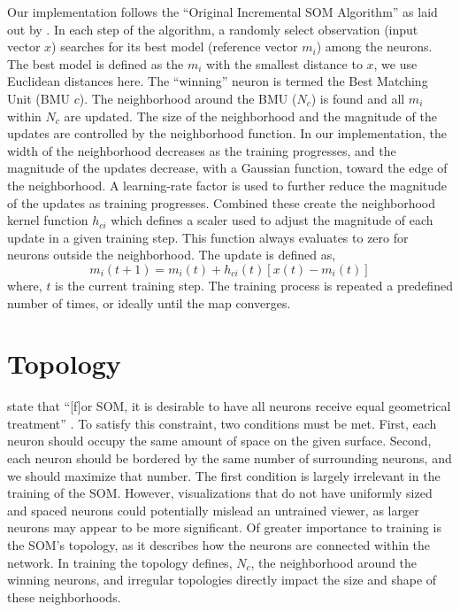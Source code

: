 Our implementation follows the ``Original Incremental SOM Algorithm'' as laid
out by \cite{Kohonen2000}.  In each step of the algorithm, a
randomly select observation (input vector $x$) searches for its best model
(reference vector $m_i$) among the neurons.  The best model is defined as the
$m_i$ with the smallest distance to $x$, we use Euclidean distances here.  The
``winning'' neuron is termed the Best Matching Unit (BMU $c$).  The
neighborhood around the BMU ($N_c$) is found and all $m_i$ within $N_c$ are
updated.  The size of the neighborhood and the magnitude of the updates are
controlled by the neighborhood function. In our implementation, the width of
the neighborhood decreases as the training progresses, and the magnitude of
the updates decrease, with a Gaussian function, toward the edge of the
neighborhood. A learning-rate factor is used to further reduce the magnitude
of the updates as training progresses.  Combined these create the neighborhood
kernel function $h_{ci}$ which defines a scaler used to adjust the magnitude
of each update in a given training step.  This function always evaluates to zero for neurons outside
the neighborhood.  The update is defined as,
\begin{equation}
  {m_i(t+1)} = m_i(t) +  h_{ci}(t)[x(t) - m_i(t)]
\label{update}
\end{equation}
where, $t$ is the current training step.  The training process is repeated a
predefined number of times, or ideally until the map converges.

\section{Topology}
\citeauthor{wu2006} state that ``[f]or SOM, it is desirable to have all
neurons receive equal geometrical treatment'' \cite[p. 900]{wu2006}.  To
satisfy this constraint, two conditions must be met.  First, each neuron
should occupy the same amount of space on the given surface.  Second, each
neuron should be bordered by the same number of surrounding neurons, and we
should maximize that number.  The first condition is largely irrelevant in the
training of the SOM.  However, visualizations that do not have uniformly sized
and spaced neurons could potentially mislead an untrained viewer, as larger
neurons may appear to be more significant. Of greater importance to
training is the SOM's topology, as it describes how the neurons are connected
within the network.  In training the topology defines, $N_c$, the neighborhood
around the winning neurons, and irregular topologies directly impact the size and
shape of these neighborhoods.  

